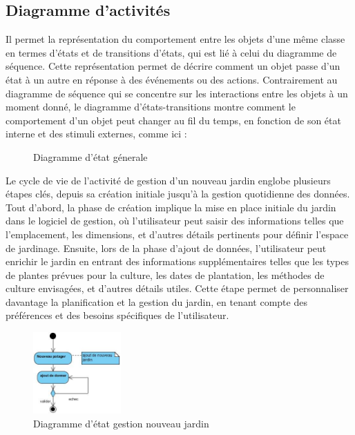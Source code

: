 \subsection{Diagramme d'activités}
Il permet la représentation du comportement entre les objets d’une même classe en termes d'états et de transitions d'états, qui est lié à celui du diagramme de séquence. Cette représentation permet de décrire comment un objet passe d'un état à un autre en réponse à des événements ou des actions. Contrairement au diagramme de séquence qui se concentre sur les interactions entre les objets à un moment donné, le diagramme d'états-transitions montre comment le comportement d'un objet peut changer au fil du temps, en fonction de son état interne et des stimuli externes, comme ici :\\
\begin{figure}[!h]
    	\center
   		\caption{Diagramme d'état génerale}
    	\label{Diagramme d'état génerale}
	\end{figure}
	Le cycle de vie de l'activité de gestion d'un nouveau jardin englobe plusieurs étapes clés, depuis sa création initiale jusqu'à la gestion quotidienne des données. Tout d'abord, la phase de création implique la mise en place initiale du jardin dans le logiciel de gestion, où l'utilisateur peut saisir des informations telles que l'emplacement, les dimensions, et d'autres détails pertinents pour définir l'espace de jardinage.
Ensuite, lors de la phase d'ajout de données, l'utilisateur peut enrichir le jardin en entrant des informations supplémentaires telles que les types de plantes prévues pour la culture, les dates de plantation, les méthodes de culture envisagées, et d'autres détails utiles. Cette étape permet de personnaliser davantage la planification et la gestion du jardin, en tenant compte des préférences et des besoins spécifiques de l'utilisateur.
	\begin{figure}[!h]
    	\center
    		\includegraphics[width=0.3\textwidth]{image/diagrame2/gerer_potager_new.jpg}
   		\caption{Diagramme d'état gestion nouveau jardin}
    	\label{Diagramme d'état  gestion nouveau jardin}
	\end{figure}
